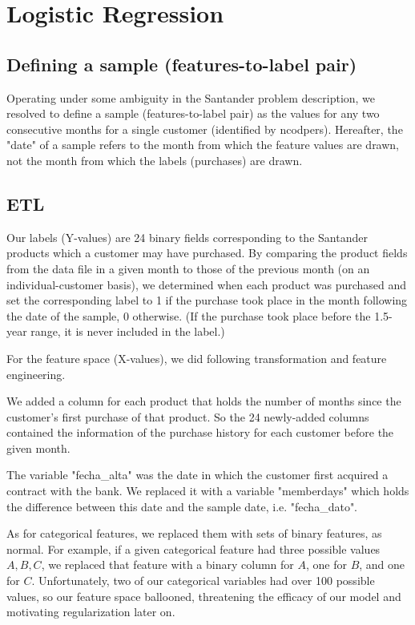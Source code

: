 \documentclass{article}
\begin{document}
\begin{spacing}{1}
\begin{large}
\begin{enumerate}
\end{enumerate}

\section{Logistic Regression}

\subsection{Defining a sample (features-to-label pair)}

Operating under some ambiguity in the Santander problem description, we resolved to define a sample (features-to-label pair) as the values for any two consecutive months for a single customer (identified by ncodpers). Hereafter, the "date" of a sample refers to the month from which the feature values are drawn, not the month from which the labels (purchases) are drawn.

\subsection{ETL}

Our labels (Y-values) are 24 binary fields corresponding to the Santander products which a customer may have purchased. By comparing the product fields from the data file in a given month to those of the previous month (on an individual-customer basis), we determined when each product was purchased and set the corresponding label to 1 if the purchase took place in the month following the date of the sample, 0 otherwise. (If the purchase took place before the 1.5-year range, it is never included in the label.)

For the feature space (X-values), we did following transformation and feature engineering.

We added a column for each product that holds the number of months since the customer’s first purchase of that product. So the 24 newly-added columns contained the information of the purchase history for each customer before the given month.

The variable "fecha\_alta" was the date in which the customer first acquired a contract with the bank. We replaced it with a variable "memberdays" which holds the difference between this date and the sample date, i.e. "fecha\_dato".

As for categorical features, we replaced them with sets of binary features, as normal. For example, if a given categorical feature had three possible values ${A,B,C}$, we replaced that feature with a binary column for $A$, one for $B$, and one for $C$. Unfortunately, two of our categorical variables had over 100 possible values, so our feature space ballooned, threatening the efficacy of our model and motivating regularization later on.


\end{large}
\end{spacing}
\end{document}
